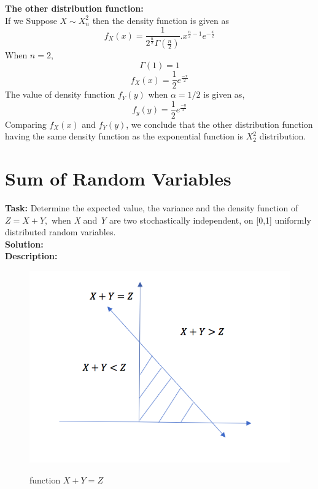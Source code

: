 \noindent \textbf{The other distribution function:}\\
\noindent If we Suppose $X \sim X_n^2$ then the density function is given as 
$$f_X(x)=\frac{1}{2^{\frac{n}{2}}\Gamma(\frac{n}{2})}.x^{\frac{n}{2}-1}e^{-\frac{x}{2}}$$
\noindent When $n = 2$,
$$\Gamma(1)= 1 $$
$$f_X(x) = \frac{1}{2} e^{\frac{-x}{2}}$$
\noindent The value of density function $f_Y(y)$ when $\alpha = 1/2$ is given as,
$$f_y(y) = \frac{1}{2}  e^{\frac{-y}{2}} $$
\noindent Comparing $f_X(x)$ and $f_Y(y)$, we conclude that the other distribution function having the same density function as the exponential function is $X_2^2 $ distribution.\\
 
 
\section{Sum of Random Variables}
\noindent \textbf{Task:} Determine the expected value, the variance and the density function of  $Z=X+Y,$ when \textit{X} and \textit{Y} are two stochastically independent, on [0,1] uniformly distributed random variables.\\

\noindent \textbf{Solution:} \\
\noindent \textbf{Description:} 
\begin{figure}[H]
\centering
{\includegraphics[scale=0.48]{5.png}}
\caption{function $X + Y = Z$}
\end{figure}

